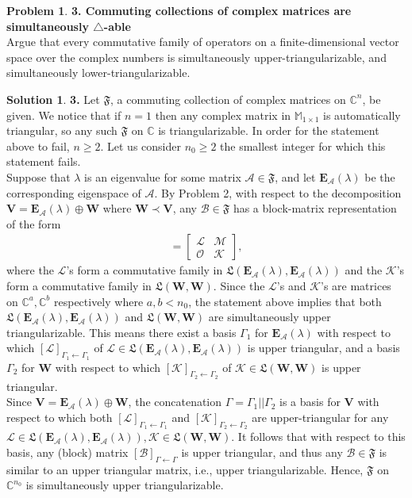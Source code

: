 \documentclass{book}
\theoremstyle{definition}
\newtheorem*{prob*}{Problem}
\newtheorem*{sln*}{Solution}
\newcommand{\V}{\mathbf{V}}
\newcommand{\W}{\mathbf{W}}
\newcommand{\A}{\mathcal{A}}
\newcommand{\B}{\mathcal{B}}
\newcommand{\lag}{\mathcal{L}}
\newcommand{\M}{\mathcal{M}}
\newcommand{\K}{\mathcal{K}}
\newcommand{\FF}{\mathfrak{F}}
\newcommand{\LL}{\mathfrak{L}}
\begin{document}
\newpage


\begin{prob*}\textbf{3. Commuting collections of complex matrices are simultaneously $\triangle$-able} \\
	Argue that every commutative family of operators on a finite-dimensional vector space over the complex numbers is simultaneously upper-triangularizable, and simultaneously lower-triangularizable. \\
	
	\begin{sln*}\textbf{3. }Let $\FF$, a commuting collection of complex matrices on $\mathbb{C}^n$, be given. We notice that if $n=1$ then any complex matrix in $\mathbb{M}_{1\times 1}$ is automatically triangular, so any such $\FF$ on $\mathbb{C}$ is triangularizable. In order for the statement above to fail, $n \geq 2$. Let us consider $n_0 \geq 2$ the smallest integer for which this statement fails. \\
		
	Suppose that $\lambda$ is an eigenvalue for some matrix $\A \in \FF$, and let $\textbf{E}_\A(\lambda)$ be the corresponding eigenspace of $\A$. By Problem 2, with respect to the decomposition $\V = \textbf{E}_\A(\lambda) \oplus \W$ where $\W \prec \V$, any $\B \in \FF$ has a block-matrix representation of the form 
	\begin{align*}
	[\B] = \begin{bmatrix}
	\lag & \M \\
	\mathcal{O} & \K
	\end{bmatrix},
	\end{align*} 
	where the $\lag$'s form a commutative family in $\LL(\textbf{E}_\A(\lambda),\textbf{E}_\A(\lambda))$ and the $\K$'s form a commutative family in $\LL(\W,\W)$. Since the $\lag$'s and $\K$'s are matrices on $\mathbb{C}^a, \mathbb{C}^b$ respectively where $a,b < n_0$, the statement above implies that both $\LL(\textbf{E}_\A(\lambda),\textbf{E}_\A(\lambda))$ and $\LL(\W,\W)$ are simultaneously upper triangularizable. This means there exist a basis $\Gamma_1$ for $\textbf{E}_\A(\lambda)$ with respect to which $[\lag]_{\Gamma_1\leftarrow\Gamma_1}$ of $\lag \in \LL(\textbf{E}_\A(\lambda),\textbf{E}_\A(\lambda))$ is upper triangular, and a basis $\Gamma_2$ for $\W$ with respect to which $[\K]_{\Gamma_2\leftarrow\Gamma_2}$ of $\K \in \LL(\W,\W)$ is upper triangular. \\
	
	Since $\V = \textbf{E}_\A(\lambda)\oplus \W$, the concatenation $\Gamma = \Gamma_1 || \Gamma_2$ is a basis for $\V$ with respect to which both $[\lag]_{\Gamma_1\leftarrow\Gamma_1}$ and $[\K]_{\Gamma_2\leftarrow\Gamma_2}$ are upper-triangular for any $\lag \in \LL(\textbf{E}_\A(\lambda),\textbf{E}_\A(\lambda)), \K\in \LL(\W,\W)$. It follows that with respect to this basis, any (block) matrix $[\B]_{\Gamma\leftarrow\Gamma}$ is upper triangular, and thus any $\B \in \FF$ is similar to an upper triangular matrix, i.e., upper triangularizable. Hence, $\FF$ on $\mathbb{C}^{n_0}$ is simultaneously upper triangularizable. \\
	

\end{sln*}
\end{prob*}
\end{document}
